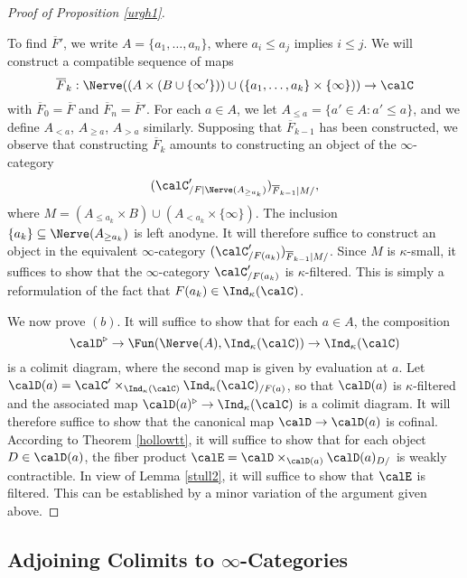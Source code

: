 \begin{proof}[Proof of Proposition \ref{urgh1}]
\begin{itemize}
\end{itemize}
To find $\overline{F}'$, we write $A = \{ a_1, \ldots, a_n \}$, where $a_i \leq a_{j}$ implies
$i \leq j$. We will construct a compatible sequence of maps
$$ \overline{F}_{k}: \Nerve( (A \times (B \cup \{ \infty' \})) \cup ( \{ a_1, \ldots, a_k \} \times \{\infty \} )) \rightarrow \calC$$
with $\overline{F}_0 = \overline{F}$ and $\overline{F}_{n} = \overline{F}'$. For each
$a \in A$, we let $ A_{\leq a} = \{ a' \in A: a' \leq a \}$, and we define $A_{< a}$, $A_{\geq a}$, $A_{> a}$ similarly. Supposing that
$\overline{F}_{k-1}$ has been constructed, we observe that constructing $\overline{F}_{k}$
amounts to constructing an object of the $\infty$-category
$$ ( \calC'_{ / F | \Nerve( A_{\geq a_k} )} )_{ \overline{F}_{k-1} | M /},$$
where $M = (A_{\leq a_k} \times B) \cup ( A_{ < a_k } \times \{ \infty \} )$.
The inclusion $\{ a_k \} \subseteq \Nerve( A_{ \geq a_k })$ is left anodyne. It will therefore suffice to construct an object in the equivalent $\infty$-category
$ ( \calC'_{/F(a_k) })_{ \overline{F}_{k-1} |M/ }$. Since $M$ is $\kappa$-small, it suffices to show that
the $\infty$-category $\calC'_{/F(a_k)}$ is $\kappa$-filtered. This is simply a reformulation of the fact that $F(a_k) \in \Ind_{\kappa}(\calC)$. 

We now prove $(b)$. It will suffice to show that for each $a \in A$, the composition
$$ \calD^{\triangleright} \rightarrow \Fun( \Nerve(A), \Ind_{\kappa}(\calC) ) \rightarrow
\Ind_{\kappa}(\calC)$$ is a colimit diagram, where the second map is given by evaluation at $a$. Let $\calD(a) = \calC' \times_{ \Ind_{\kappa}(\calC) } \Ind_{\kappa}(\calC)_{/F(a)}$, so that
$\calD(a)$ is $\kappa$-filtered and the associated map $\calD(a)^{\triangleright} \rightarrow \Ind_\kappa(\calC)$ is a colimit diagram. It will therefore suffice to show that the canonical map
$\calD \rightarrow \calD(a)$ is cofinal. According to Theorem \ref{hollowtt}, it will suffice to show that for each object $D \in \calD(a)$, the fiber product
$\calE = \calD \times_{ \calD(a) } \calD(a)_{D/}$ is weakly contractible. In view of Lemma \ref{stull2}, it will suffice to show that $\calE$ is filtered. This can be established by a minor variation of the argument given above.
\end{proof}

\subsection{Adjoining Colimits to $\infty$-Categories}\label{agileco}

